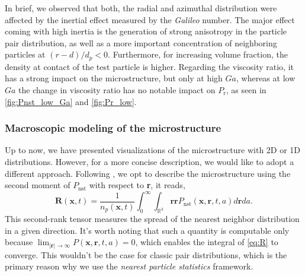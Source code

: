In brief, we observed that both, the radial and azimuthal distribution were affected by the inertial effect measured by the \textit{Galileo} number. 
The major effect coming with high inertia is the generation of strong anisotropy in the particle pair distribution, as well as a more important concentration of neighboring particles at $(r-d)/d_p < 0$. 
Furthermore, for increasing volume fraction, the density at contact of the test particle is higher. 
Regarding the viscosity ratio, it has a strong impact on the microstructure, but only at high $Ga$, whereas at low $Ga$ the change in viscosity ratio has no notable impact on $P_\text{r}$, as seen in \ref{fig:Pnst_low_Ga} and \ref{fig:Pr_low}. 

\subsubsection*{Macroscopic modeling of the microstructure}
Up to now, we have presented visualizations of the microstructure with 2D or 1D distributions. 
However, for a more concise description, we would like to adopt a different approach. 
Following \citet{zhang2023evolution}, we opt to describe the microstructure using the second moment of $P_\text{nst}$ with respect to \textbf{r}, it reads,
\begin{equation}
    \textbf{R}(\textbf{x},t) =\frac{1}{n_p(\textbf{x},t)} 
    \int_0^\infty 
    \int_{\mathbb{R}^3} \textbf{rr} P_\text{nst}(\textbf{x},\textbf{r},t,a) d\textbf{r} da.
    \label{eq:R}
\end{equation}
This second-rank tensor measures the spread of the nearest neighbor distribution in a given direction. 
It's worth noting that such a quantity is computable only because $\lim_{|\textbf{r}|\to \infty} P(\textbf{x},\textbf{r},t,a) = 0$, which enables the integral of \ref{eq:R} to converge. 
This wouldn't be the case for classic pair distributions, which is the primary reason why we use the \textit{nearest particle statistics} framework. 

